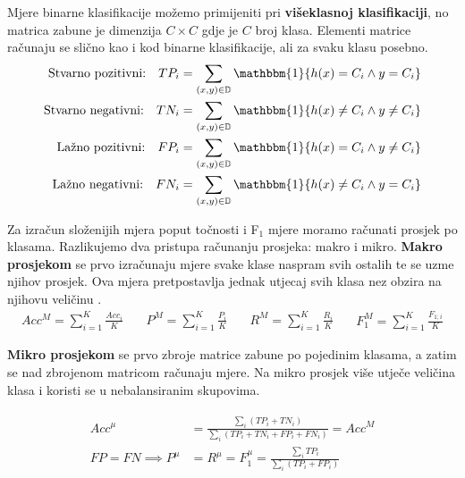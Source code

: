 \documentclass[times, utf8, diplomski]{fer}
\def\F1{F$_1$}
\begin{document}
Mjere binarne klasifikacije možemo primijeniti pri \textbf{višeklasnoj klasifikaciji}, no matrica zabune je dimenzija $C\times C$ gdje je $C$ broj klasa. Elementi matrice računaju se slično kao i kod binarne klasifikacije, ali za svaku klasu posebno.
\begin{align}
\label{eq:true_groups}
\begin{split}
\text{Stvarno pozitivni:} \quad TP_i &= \sum_{(x,y)\in\mathbb{D}} \mathbbm{1} \{h(x) =  C_i \wedge y = C_i \} \\
\text{Stvarno negativni:} \quad TN_i &= \sum_{(x,y)\in\mathbb{D}} \mathbbm{1} \{h(x) \neq C_i \wedge y \neq C_i \} \\
\text{Lažno pozitivni:} \quad FP_i &= \sum_{(x,y)\in\mathbb{D}} \mathbbm{1} \{h(x) = C_i \wedge y \neq C_i \} \\
\text{Lažno negativni:} \quad FN_i &= \sum_{(x,y)\in\mathbb{D}} \mathbbm{1} \{h(x) \neq C_i \wedge y = C_i \}
\end{split}
\end{align}

Za izračun složenijih mjera poput točnosti i \F1 mjere moramo računati prosjek po klasama. Razlikujemo dva pristupa računanju prosjeka: makro i mikro. \textbf{Makro prosjekom} se prvo izračunaju mjere svake klase naspram svih ostalih te se uzme njihov prosjek. Ova mjera pretpostavlja jednak utjecaj svih klasa nez obzira na njihovu veličinu \citep{ml_probabilistic}.
\begin{equation}
\begin{split}
Acc^M = \sum_{i=1}^K \frac{Acc_i}{K}
\end{split} \quad
\begin{split}
P^M = \sum_{i=1}^K \frac{P_i}{K}
\end{split} \quad
\begin{split}
R^M = \sum_{i=1}^K \frac{R_i}{K}
\end{split} \quad
\begin{split}
F_1^M = \sum_{i=1}^K \frac{F_{1;i}}{K}
\end{split}
\end{equation}

\textbf{Mikro prosjekom} se prvo zbroje matrice zabune po pojedinim klasama, a zatim se nad zbrojenom matricom računaju mjere. Na mikro prosjek više utječe veličina klasa i koristi se u nebalansiranim skupovima.

\begin{align}
\begin{split}
Acc^\mu &= \frac{\sum_i (TP_i+TN_i)}{\sum_i (TP_i+TN_i+FP_i+FN_i)} = Acc^M \\
FP = FN \implies P^\mu &= R^\mu = F_1^\mu = \frac{\sum_i TP_i}{\sum_i (TP_i+FP_i)}
\end{split}
\end{align}
\end{document}
